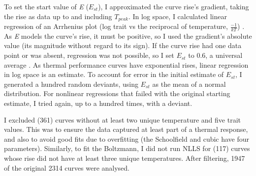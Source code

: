 \documentclass[11pt]{article}
\begin{document}
To set the start value of \textit{E} ($E_{st}$), I approximated the curve rise's gradient, taking the rise as data up to and including $T_{peak}$.
In log space, I calculated linear regression of an Arrhenius plot (log trait vs the reciprocal of temperature, $\frac{-1}{kT}$) \cite{Pawar2016, SchoolfieldSharpe1981}.
As \textit{E} models the curve's rise, it must be positive, so I used the gradient's absolute value (its magnitude without regard to its sign).
If the curve rise had one data point or was absent,
regression was not possible, so I set $E_{st}$ to 0.6, a universal average \cite{Dell2011}. %
As thermal performance curves %
have exponential rises,
linear regression in log space is an estimate.
To account for error in the initial estimate of $E_{st}$, I generated a hundred random deviants, using $E_{st}$ as the mean of a normal distribution.
For nonlinear regressions that failed with the original starting estimate, I tried again, up to a hundred times, with a deviant.


I excluded (361) curves without at least two unique temperature and five trait values.
This was to ensure the data captured at least part of a thermal response, and also to avoid good fits due to overfitting (the Schoolfield and cubic have four parameters).
Similarly, to fit the Boltzmann, I did not run NLLS for (117) curves whose rise did not have at least three unique temperatures.
After filtering, 1947 of the original 2314 curves were analysed.
\end{document}

